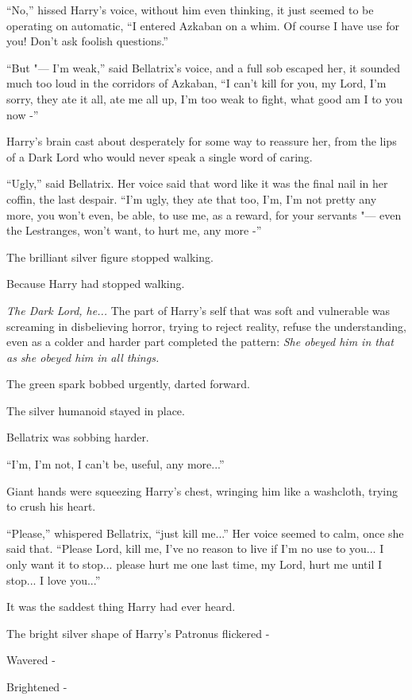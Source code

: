``No,'' hissed Harry's voice, without him even thinking, it just seemed
to be operating on automatic, ``I entered Azkaban on a whim. Of course I
have use for you! Don't ask foolish questions.''

``But "--- I'm weak,'' said Bellatrix's voice, and a full sob escaped her,
it sounded much too loud in the corridors of Azkaban, ``I can't kill for
you, my Lord, I'm sorry, they ate it all, ate me all up, I'm too weak to
fight, what good am I to you now -''

Harry's brain cast about desperately for some way to reassure her, from
the lips of a Dark Lord who would never speak a single word of caring.

``Ugly,'' said Bellatrix. Her voice said that word like it was the final
nail in her coffin, the last despair. ``I'm ugly, they ate that too,
I'm, I'm not pretty any more, you won't even, be able, to use me, as a
reward, for your servants "--- even the Lestranges, won't want, to hurt me,
any more -''

The brilliant silver figure stopped walking.

Because Harry had stopped walking.

\emph{The Dark Lord, he...} The part of Harry's self that was soft
and vulnerable was screaming in disbelieving horror, trying to reject
reality, refuse the understanding, even as a colder and harder part
completed the pattern: \emph{She obeyed him in that as she obeyed him in
all things.}

The green spark bobbed urgently, darted forward.

The silver humanoid stayed in place.

Bellatrix was sobbing harder.

``I'm, I'm not, I can't be, useful, any more...''

Giant hands were squeezing Harry's chest, wringing him like a washcloth,
trying to crush his heart.

``Please,'' whispered Bellatrix, ``just kill me...'' Her voice
seemed to calm, once she said that. ``Please Lord, kill me, I've no
reason to live if I'm no use to you... I only want it to
stop... please hurt me one last time, my Lord, hurt me until I
stop... I love you...''

It was the saddest thing Harry had ever heard.

The bright silver shape of Harry's Patronus flickered -

Wavered -

Brightened -

